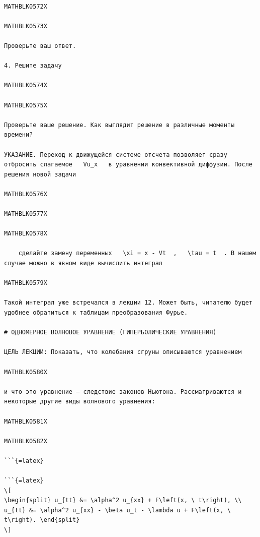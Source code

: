 \documentclass[
]{article}
\begin{document}
\begin{verbatim}

MATHBLK0572X

MATHBLK0573X

Проверьте ваш ответ.

4. Решите задачу

MATHBLK0574X

MATHBLK0575X

Проверьте ваше решение. Как выглядит решение в различные моменты времени?

УКАЗАНИЕ. Переход к движущейся системе отсчета позволяет сразу отбросить слагаемое   Vu_x   в уравнении конвективной диффузии. После решения новой задачи

MATHBLK0576X

MATHBLK0577X

MATHBLK0578X

    сделайте замену переменных   \xi = x - Vt  ,   \tau = t  . В нашем случае можно в явном виде вычислить интеграл

MATHBLK0579X

Такой интеграл уже встречался в лекции 12. Может быть, читателю будет удобнее обратиться к таблицам преобразования Фурье.

# ОДНОМЕРНОЕ ВОЛНОВОЕ УРАВНЕНИЕ (ГИПЕРБОЛИЧЕСКИЕ УРАВНЕНИЯ)

ЦЕЛЬ ЛЕКЦИИ: Показать, что колебания сгруны описываются уравнением

MATHBLK0580X

и что это уравнение — следствие законов Ньютона. Рассматриваются и некоторые другие виды волнового уравнения:

MATHBLK0581X

MATHBLK0582X

```{=latex}

```{=latex}
\[
\begin{split} u_{tt} &= \alpha^2 u_{xx} + F\left(x, \ t\right), \\ u_{tt} &= \alpha^2 u_{xx} - \beta u_t - \lambda u + F\left(x, \ t\right). \end{split}
\]
\end{verbatim}
\end{document}
